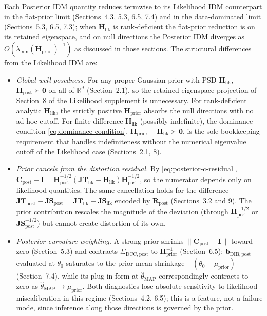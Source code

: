 \documentclass[11pt]{article}
\begin{document}
Each Posterior IDM quantity reduces termwise to its Likelihood IDM counterpart in the flat-prior limit (Sections~4.3, 5.3, 6.5, 7.4) and in the data-dominated limit (Sections~5.3, 6.5, 7.3); when $\mathbf H_{\mathrm{lik}}$ is rank-deficient the flat-prior reduction is on its retained eigenspace, and on null directions the Posterior IDM diverges as $O(\lambda_{\min}(\mathbf H_{\mathrm{prior}})^{-1})$ as discussed in those sections. The structural differences from the Likelihood IDM are:
\begin{itemize}
\item \emph{Global well-posedness.} For any proper Gaussian prior with PSD $\mathbf H_{\mathrm{lik}}$, $\mathbf H_{\mathrm{post}} \succ \mathbf 0$ on all of $\mathbb{R}^d$ (Section~2.1), so the retained-eigenspace projection of Section~8 of the Likelihood supplement is unnecessary. For rank-deficient analytic $\mathbf H_{\mathrm{lik}}$, the strictly positive $\mathbf H_{\mathrm{prior}}$ absorbs the null directions with no ad hoc cutoff. For finite-difference $\mathbf H_{\mathrm{lik}}$ (possibly indefinite), the dominance condition \eqref{eq:dominance-condition}, $\mathbf H_{\mathrm{prior}} - \mathbf H_{\mathrm{lik}}^{-} \succ \mathbf 0$, is the sole bookkeeping requirement that handles indefiniteness without the numerical eigenvalue cutoff of the Likelihood case (Sections~2.1, 8).
\item \emph{Prior cancels from the distortion residual.} By \eqref{eq:posterior-c-residual}, $\mathbf C_{\mathrm{post}} - \mathbf I = \mathbf H_{\mathrm{post}}^{-1/2}(\mathbf{JT}_{\mathrm{lik}} - \mathbf H_{\mathrm{lik}})\mathbf H_{\mathrm{post}}^{-1/2}$, so the numerator depends only on likelihood quantities. The same cancellation holds for the difference $\mathbf{JT}_{\mathrm{post}} - \mathbf{JS}_{\mathrm{post}} = \mathbf{JT}_{\mathrm{lik}} - \mathbf{JS}_{\mathrm{lik}}$ encoded by $\mathbf R_{\mathrm{post}}$ (Sections~3.2 and 9). The prior contribution rescales the magnitude of the deviation (through $\mathbf H_{\mathrm{post}}^{-1/2}$ or $\mathbf{JS}_{\mathrm{post}}^{-1/2}$) but cannot create distortion of its own.
\item \emph{Posterior-curvature weighting.} A strong prior shrinks $\|\mathbf C_{\mathrm{post}} - \mathbf I\|$ toward zero (Section~5.3) and contracts $\Sigma_{\mathrm{DCC},\mathrm{post}}$ to $\mathbf H_{\mathrm{prior}}^{-1}$ (Section~6.5); $\mathbf b_{\mathrm{DIB},\mathrm{post}}$ evaluated at $\theta_0$ saturates to the prior-mean shrinkage $-(\theta_0 - \mu_{\mathrm{prior}})$ (Section~7.4), while its plug-in form at $\widehat\theta_{\mathrm{MAP}}$ correspondingly contracts to zero as $\widehat\theta_{\mathrm{MAP}} \to \mu_{\mathrm{prior}}$. Both diagnostics lose absolute sensitivity to likelihood miscalibration in this regime (Sections~4.2, 6.5); this is a feature, not a failure mode, since inference along those directions is governed by the prior.

\end{itemize}
\end{document}
